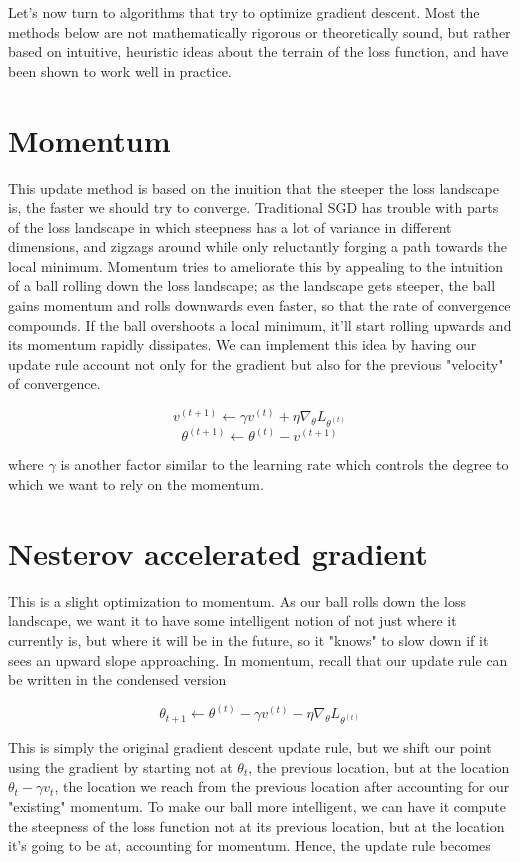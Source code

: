 \documentclass{article}
\begin{document}
Let's now turn to algorithms that try to optimize gradient descent. Most the methods below are not mathematically rigorous or theoretically sound, but rather based on intuitive, heuristic ideas about the terrain of the loss function, and have been shown to work well in practice.

\section{Momentum}
This update method is based on the inuition that the steeper the loss landscape is, the faster we should try to converge. Traditional SGD has trouble with parts of the loss landscape in which steepness has a lot of variance in different dimensions, and zigzags around while only reluctantly forging a path towards the local minimum. Momentum tries to ameliorate this by appealing to the intuition of a ball rolling down the loss landscape; as the landscape gets steeper, the ball gains momentum and rolls downwards even faster, so that the rate of convergence compounds. If the ball overshoots a local minimum, it'll start rolling upwards and its momentum rapidly dissipates. We can implement this idea by having our update rule account not only for the gradient but also for the previous "velocity" of convergence.

    $$ v^{(t + 1)} \gets \gamma v^{(t)} + \eta \nabla_\theta L_{\theta^{(t)}} $$
    $$ \theta^{(t + 1)} \gets \theta^{(t)} - v^{(t + 1)} $$

where $ \gamma $ is another factor similar to the learning rate which controls the degree to which we want to rely on the momentum.

\section{Nesterov accelerated gradient}
This is a slight optimization to momentum. As our ball rolls down the loss landscape, we want it to have some intelligent notion of not just where it currently is, but where it will be in the future, so it "knows" to slow down if it sees an upward slope approaching. In momentum, recall that our update rule can be written in the condensed version

    $$ \theta_{t + 1} \gets \theta^{(t)} - \gamma v^{(t)} - \eta \nabla_\theta L_{\theta^{(t)}} $$

This is simply the original gradient descent update rule, but we shift our point using the gradient by starting not at $ \theta_t $, the previous location, but at the location $ \theta_t - \gamma v_t $, the location we reach from the previous location after accounting for our "existing" momentum. To make our ball more intelligent, we can have it compute the steepness of the loss function not at its previous location, but at the location it's going to be at, accounting for momentum. Hence, the update rule becomes
\end{document}
